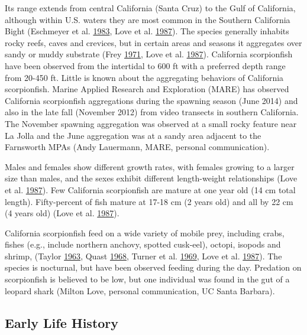 \documentclass[12pt,]{article}
\begin{document}
Its range extends from central California (Santa Cruz) to the Gulf of
California, although within U.S. waters they are most common in the
Southern California Bight (Eschmeyer et al.
\protect\hyperlink{ref-Eschmeyer1983}{1983}, Love et al.
\protect\hyperlink{ref-Love1987}{1987}). The species generally inhabits
rocky reefs, caves and crevices, but in certain areas and seasons it
aggregates over sandy or muddy substrate (Frey
\protect\hyperlink{ref-Frey1971}{1971}, Love et al.
\protect\hyperlink{ref-Love1987}{1987}). California scorpionfish have
been observed from the intertidal to 600 ft with a preferred depth range
from 20-450 ft. Little is known about the aggregating behaviors of
California scorpionfish. Marine Applied Research and Exploration (MARE)
has observed California scorpionfish aggregations during the spawning
season (June 2014) and also in the late fall (November 2012) from video
transects in southern California. The November spawning aggregation was
observed at a small rocky feature near La Jolla and the June aggregation
was at a sandy area adjacent to the Farnsworth MPAs (Andy Lauermann,
MARE, personal communication).

Males and females show different growth rates, with females growing to a
larger size than males, and the sexes exhibit different length-weight
relationships (Love et al. \protect\hyperlink{ref-Love1987}{1987}). Few
California scorpionfish are mature at one year old (14 cm total length).
Fifty-percent of fish mature at 17-18 cm (2 years old) and all by 22 cm
(4 years old) (Love et al. \protect\hyperlink{ref-Love1987}{1987}).

California scorpionfish feed on a wide variety of mobile prey, including
crabs, fishes (e.g., include northern anchovy, spotted cusk-eel),
octopi, isopods and shrimp, (Taylor
\protect\hyperlink{ref-Taylor1963}{1963}, Quast
\protect\hyperlink{ref-Quast1968}{1968}, Turner et al.
\protect\hyperlink{ref-Turner1969}{1969}, Love et al.
\protect\hyperlink{ref-Love1987}{1987}). The species is nocturnal, but
have been observed feeding during the day. Predation on scorpionfish is
believed to be low, but one individual was found in the gut of a leopard
shark (Milton Love, personal communication, UC Santa Barbara).

\subsection{Early Life History}\label{early-life-history}
\end{document}
